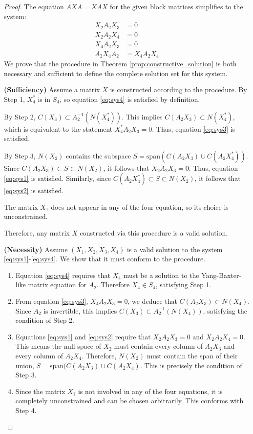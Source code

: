 \documentclass{article}
\begin{document}
\begin{proof}
  The equation $AXA = XAX$ for the given block matrices simplifies to the system:
  \begin{align}
    X_2 A_2 X_3 &= 0 \label{eq:sys1}\\
    X_2 A_2 X_4 &= 0 \label{eq:sys2}\\
    X_4 A_2 X_3 &= 0 \label{eq:sys3}\\
    A_2 X_4 A_2 &= X_4 A_2 X_4 \label{eq:sys4}
  \end{align}
  We prove that the procedure in Theorem \ref{prop:constructive_solution} is both necessary and sufficient to define the complete solution set for this system.

  \textbf{(Sufficiency)}
  Assume a matrix $X$ is constructed according to the procedure.
  By Step 1, $X_4^*$ is in $S_4$, so equation \eqref{eq:sys4} is satisfied by definition.

  By Step 2, $C(X_3) \subset A_2^{-1} (N(X_4^*))$.
  This implies $C(A_2 X_3) \subset N(X_4^*)$, which is equivalent to the statement $X_4^* A_2 X_3 = 0$.
  Thus, equation \eqref{eq:sys3} is satisfied.

  By Step 3, $N(X_2)$ contains the subspace $S = \text{span}(C(A_2 X_3) \cup C(A_2 X_4^*))$.
  Since $C(A_2 X_3) \subset S \subset N(X_2)$, it follows that $X_2 A_2 X_3 = 0$.
  Thus, equation \eqref{eq:sys1} is satisfied.
  Similarly, since $C(A_2 X_4^*) \subset S \subset N(X_2)$, it follows that \eqref{eq:sys2} is satisfied.

  The matrix $X_1$ does not appear in any of the four equation, so its choice is unconstrained.

  Therefore, any matrix $X$ constructed via this procedure is a valid solution.

  \textbf{(Necessity)}
  Assume $(X_1, X_2, X_3, X_4)$ is a valid solution to the system \eqref{eq:sys1}-\eqref{eq:sys4}.
  We show that it must conform to the procedure.
  \begin{enumerate}
    \item Equation \eqref{eq:sys4} requires that $X_4$ must be a solution to the Yang-Baxter-like matrix equation for $A_2$.
      Therefore $X_4 \in S_4$, satisfying Step 1.
    \item From equation \eqref{eq:sys3}, $X_4 A_2 X_3 = 0$, we deduce that $C(A_2 X_3) \subset N(X_4)$.
      Since $A_2$ is invertible, this implies $C(X_3) \subset A_2^{-1} (N(X_4))$, satisfying the condition of Step 2.
    \item Equations \eqref{eq:sys1} and \eqref{eq:sys2} require that $X_2 A_2 X_3 = 0$ and $X_2 A_2 X_4 = 0$.
      This means the null space of $X_2$ must contain every column of $A_2 X_3$ and every column of $A_2 X_4$.
      Therefore, $N(X_2)$ must contain the span of their union, $S = \text{span} (C(A_2 X_3) \cup C(A_2 X_4)$.
      This is precisely the condition of Step 3.
    \item Since the matrix $X_1$ is not involved in any of the four equations, it is completely unconstrained and can be chosen arbitrarily.
      This conforms with Step 4.
  \end{enumerate}


\end{proof}
\end{document}
